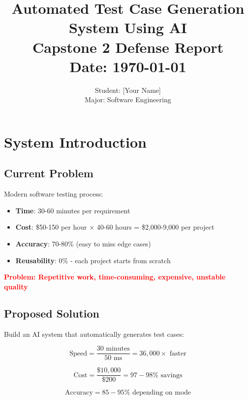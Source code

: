 \documentclass[12pt,a4paper]{report}
\title{\textbf{Automated Test Case Generation System Using AI}\\
\large Capstone 2 Defense Report\\
\normalsize Date: \today}
\author{Student: [Your Name]\\Major: Software Engineering}
\date{}
\begin{document}
\maketitle

\newpage
\tableofcontents
\newpage

\chapter{System Introduction}

\section{Current Problem}

Modern software testing process:
\begin{itemize}
    \item \textbf{Time}: 30-60 minutes per requirement
    \item \textbf{Cost}: \$50-150 per hour × 40-60 hours = \$2,000-9,000 per project
    \item \textbf{Accuracy}: 70-80\% (easy to miss edge cases)
    \item \textbf{Reusability}: 0\% - each project starts from scratch
\end{itemize}

\textcolor{red}{\textbf{Problem: Repetitive work, time-consuming, expensive, unstable quality}}

\section{Proposed Solution}

Build an AI system that automatically generates test cases:

\begin{equation}
\text{Speed} = \frac{30 \text{ minutes}}{50 \text{ ms}} = 36,000\times \text{ faster}
\end{equation}

\begin{equation}
\text{Cost} = \frac{\$10,000}{\$200} = 97-98\% \text{ savings}
\end{equation}

\begin{equation}
\text{Accuracy} = 85-95\% \text{ depending on mode}
\end{equation}
\end{document}
